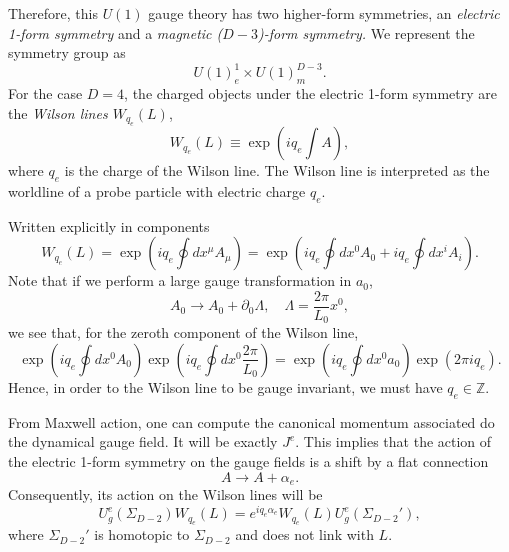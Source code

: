 \documentclass{article}
\begin{document}
Therefore, this $U(1)$ gauge theory has two higher-form symmetries, an \textit{electric 1-form symmetry} and a \textit{magnetic ($D-3$)-form symmetry.} We represent the symmetry group as 
\begin{equation}
	U(1)^1_e\times U(1)^{D-3}_m. 
\end{equation}
For the case $D=4$, the charged objects under the electric 1-form symmetry are the \textit{Wilson lines $W_{q_e}(L)$},
\begin{equation}
	W_{q_e}(L)\equiv\exp\left(iq_e\int A\right),
\end{equation}
where $q_e$ is the charge of the Wilson line. The Wilson line is interpreted as the worldline of a probe particle with electric charge $q_e$.

Written explicitly in components 
\begin{equation}
	W_{q_e}(L)=\exp\left(iq_e\oint dx^\mu A_\mu\right)=\exp\left(iq_e\oint dx^0A_0+iq_e\oint dx^iA_i\right).
\end{equation}
Note that if we perform a large gauge transformation in $a_0$,
\begin{equation}
	A_0\to A_0+\partial_0\Lambda, \quad \Lambda =\frac{2\pi}{L_0}x^0,
\end{equation} 
we see that, for the zeroth component of the Wilson line, 
\begin{equation}
	\exp\left(iq_e\oint dx^0A_0\right)\exp\left(iq_e\oint dx^0 \frac{2\pi}{L_0}\right)=\exp\left(iq_e\oint dx^0 a_0\right)\exp(2\pi i q_e). 
\end{equation} 
Hence, in order to the Wilson line to be gauge invariant, we must have $q_e\in \mathbb{Z}.$ 

From Maxwell action, one can compute the canonical momentum associated do the dynamical gauge field. It will be exactly $J^e$. This implies that the action of the electric 1-form symmetry on the gauge fields is a shift by a flat connection 
\begin{equation}
	A \to A + \alpha_e.
\end{equation}
Consequently, its action on the Wilson lines will be 
\begin{equation}
	U_g^e(\Sigma_{D-2})W_{q_e}(L) = e^{iq_e\alpha_e}W_{q_e}(L)U_g^e(\Sigma_{D-2}'),
\end{equation}
where $\Sigma_{D-2}'$ is homotopic to $\Sigma_{D-2}$ and does not link with $L$. 
\end{document}
